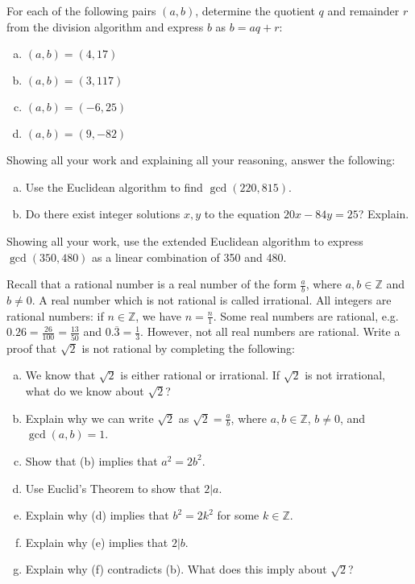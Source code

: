 \documentclass[11pt,letterpaper]{article}
\begin{document}

 For each of the following pairs $(a, b)$, determine the quotient $q$ and remainder $r$ from the division algorithm and express $b$ as $b= aq + r$:
	\begin{enumerate}[(a)]
	\item $(a, b)= (4, 17)$
	\item $(a, b)= (3, 117)$
	\item $(a, b)= (-6, 25)$
	\item $(a, b)= (9, -82)$
	\end{enumerate}



\newpage



 Showing all your work and explaining all your reasoning, answer the following:
	\begin{enumerate}[(a)]
	\item Use the Euclidean algorithm to find $\gcd(220, 815)$. 
	\item Do there exist integer solutions $x, y$ to the equation $20x - 84y= 25$? Explain.
	\end{enumerate}



\newpage



 Showing all your work, use the extended Euclidean algorithm to express $\gcd(350, 480)$ as a linear combination of 350 and 480. 



\newpage



 Recall that a rational number is a real number of the form $\frac{a}{b}$, where $a, b \in \mathbb{Z}$ and $b \neq 0$. A real number which is not rational is called irrational. All integers are rational numbers: if $n \in \mathbb{Z}$, we have $n= \frac{n}{1}$. Some real numbers are rational, e.g. $0.26= \frac{26}{100}= \frac{13}{50}$ and $0.\overline{3}= \frac{1}{3}$. However, not all real numbers are rational. Write a proof that $\sqrt{2}$ is not rational by completing the following:
	\begin{enumerate}[(a)]
	\item We know that $\sqrt{2}$ is either rational or irrational. If $\sqrt{2}$ is not irrational, what do we know about $\sqrt{2}$? 
	\item Explain why we can write $\sqrt{2}$ as $\sqrt{2}= \frac{a}{b}$, where $a, b \in \mathbb{Z}$, $b \neq 0$, and $\gcd(a, b)= 1$. 
	\item Show that (b) implies that $a^2= 2b^2$.
	\item Use Euclid's Theorem to show that $2 | a$. 
	\item Explain why (d) implies that $b^2= 2k^2$ for some $k \in \mathbb{Z}$.
	\item Explain why (e) implies that $2 | b$. 
	\item Explain why (f) contradicts (b). What does this imply about $\sqrt{2}$?
	\end{enumerate}
\end{document}
